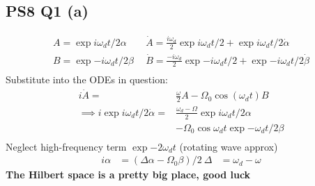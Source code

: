 \documentclass[10pt, a4paper, reprint, amsmath,amssymb, aps]{revtex4-2}
\begin{document}
    \subsection{PS8 Q1 (a)}
        \begin{align*}
            A = \exp{i\omega_d t /2}\alpha \ & \ \dot{A} = \frac{i\omega_d}{2}\exp{i\omega_d t /2}+ \exp{i\omega_d t /2}\dot{\alpha} \\
            B = \exp{-i\omega_d t /2}\beta \ & \ \dot{B} = \frac{-i\omega_d}{2}\exp{-i\omega_d t /2}+ \exp{-i\omega_d t /2}\dot{\beta} \\
        \end{align*}
        Substitute into the ODEs in question:
        \begin{align*}
            i\dot{A} =& \frac{\omega}{2}A - \Omega_0\cos(\omega_d t)B \\
            \implies i\exp{i\omega_d t / 2}\dot{\alpha} =& \frac{\omega_d -\Omega}{2}\exp{i\omega_d t / 2}\alpha \\
            &-\Omega_0\cos{\omega_d t}\exp{-\omega_d t /2}\beta \\
        \end{align*}
        Neglect high-frequency term $\exp{-2\omega_d t}$ (rotating wave approx)
        \begin{align*}
            i\alpha &= (\Delta\alpha - \Omega_0\beta)/2 \ \Delta &= \omega_d-\omega
        \end{align*}
        \textbf{The Hilbert space is a pretty big place, good luck}
        
\end{document}
